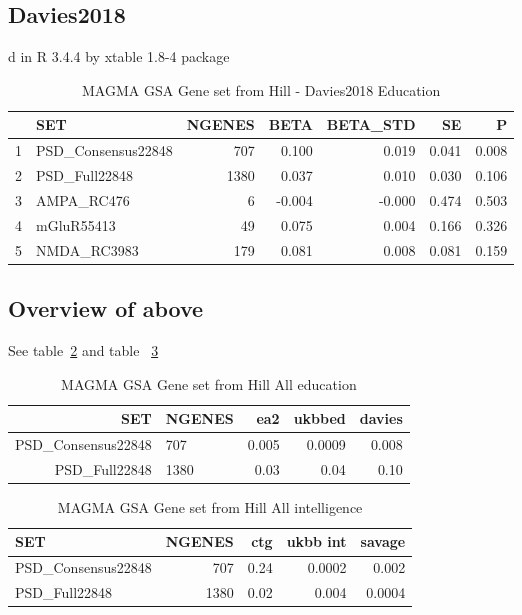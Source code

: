 \subsection{Davies2018}

d in R 3.4.4 by xtable 1.8-4 package
\begin{table}[ht]
\centering
\begin{tabular}{rlrrrrr}
  \hline
 & SET & NGENES & BETA& BETA\_STD & SE & P \\

  \hline
1 & PSD\_Consensus22848 &  707 & 0.100 & 0.019 & 0.041 & 0.008 \\ 
  2 & PSD\_Full22848 & 1380 & 0.037 & 0.010 & 0.030 & 0.106 \\ 
  3 & AMPA\_RC476 &    6 & -0.004 & -0.000 & 0.474 & 0.503 \\ 
  4 & mGluR55413 &   49 & 0.075 & 0.004 & 0.166 & 0.326 \\ 
  5 & NMDA\_RC3983 &  179 & 0.081 & 0.008 & 0.081 & 0.159 \\ 
   \hline
\end{tabular}
\caption{MAGMA GSA Gene set from Hill - Davies2018 Education}
\label{table:MAGMA_GSA_HILL_SET_DAVIES_EDUCATION}
\end{table}



\subsection{Overview of above}
See table~\ref{table:MAGMA_GSA_HILL_ALL_EDUCATION} and table ~\ref{table:MAGMA_GSA_HILL_ALL_INT}


\begin{table}[ht]
\centering
\begin{tabular}{rlrrr}
  \hline
  SET & NGENES & ea2 & ukbbed & davies  \\ 
  \hline
 PSD\_Consensus22848 &  707 & 0.005 & 0.0009 &  0.008\\ 
  PSD\_Full22848 & 1380 & 0.03 & 0.04 & 0.10  \\ 
 
   \hline
\end{tabular}
\caption{MAGMA GSA Gene set from Hill All education}
\label{table:MAGMA_GSA_HILL_ALL_EDUCATION}
\end{table}

\begin{table}[ht]
\centering
\begin{tabular}{lrrrr}
  \hline
 SET & NGENES & ctg & ukbb int & savage  \\ 
  \hline
PSD\_Consensus22848 &  707 & 0.24 & 0.0002 &  0.002\\ 
  PSD\_Full22848 & 1380 & 0.02 & 0.004 & 0.0004  \\ 
 
   \hline
\end{tabular}
\caption{MAGMA GSA Gene set from Hill All intelligence}
\label{table:MAGMA_GSA_HILL_ALL_INT}
\end{table}
